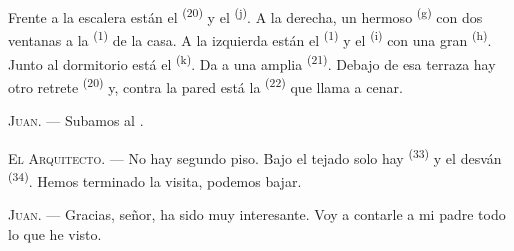 \VUsaut{3.0mm}
\VUsaut{3.0mm}

Frente a la escalera están el  \textsuperscript{(20)} y el
 \textsuperscript{(j)}. A la derecha, un hermoso 
\textsuperscript{(g)} con dos ventanas a la  \textsuperscript{(1)} de la
casa. A la izquierda están el  \textsuperscript{(1)} y el
 \textsuperscript{(i)} con una gran 
\textsuperscript{(h)}. Junto al dormitorio está el 
\textsuperscript{(k)}. Da a una amplia  \textsuperscript{(21)}. Debajo de
esa terraza hay otro retrete \textsuperscript{(20)} y, contra la pared está la
 \textsuperscript{(22)} que llama a cenar.

\textsc{Juan}. --- Subamos al .

\textsc{El Arquitecto}. --- No hay segundo piso. Bajo el tejado solo hay
 \textsuperscript{(33)} y el desván \textsuperscript{(34)}. Hemos
terminado la visita, podemos bajar.

\textsc{Juan}. --- Gracias, señor, ha sido muy interesante. Voy a contarle
a mi padre todo lo que he visto.
\VUsaut{4.0mm}
\VUfilet{22mm}
